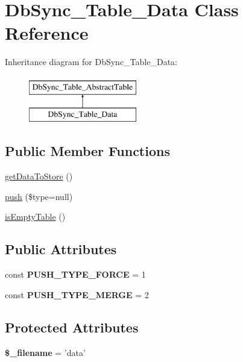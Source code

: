 \hypertarget{classDbSync__Table__Data}{
\section{DbSync\_\-Table\_\-Data Class Reference}
\label{classDbSync__Table__Data}
}
Inheritance diagram for DbSync\_\-Table\_\-Data:\begin{figure}[H]
\begin{center}
\leavevmode
\includegraphics[height=2.000000cm]{classDbSync__Table__Data}
\end{center}
\end{figure}
\subsection*{Public Member Functions}
\begin{DoxyCompactItemize}
\item 
\hyperlink{classDbSync__Table__Data_a20a58562f3d88d85e5cb9b25f8f0e1dd}{getDataToStore} ()
\item 
\hyperlink{classDbSync__Table__Data_a9aabe67240f491f9b65371e5b94035c9}{push} (\$type=null)
\item 
\hyperlink{classDbSync__Table__Data_ac0e0899e75987cc0d69bff20cc373985}{isEmptyTable} ()
\end{DoxyCompactItemize}
\subsection*{Public Attributes}
\begin{DoxyCompactItemize}
\item 
\hypertarget{classDbSync__Table__Data_a8e2a613542f603afc3908ee00de3341c}{
const {\bfseries PUSH\_\-TYPE\_\-FORCE} = 1}
\label{classDbSync__Table__Data_a8e2a613542f603afc3908ee00de3341c}

\item 
\hypertarget{classDbSync__Table__Data_a8e7ab56799909572dfec44cb5f3cfa58}{
const {\bfseries PUSH\_\-TYPE\_\-MERGE} = 2}
\label{classDbSync__Table__Data_a8e7ab56799909572dfec44cb5f3cfa58}

\end{DoxyCompactItemize}
\subsection*{Protected Attributes}
\begin{DoxyCompactItemize}
\item 
\hypertarget{classDbSync__Table__Data_a7142c5a301b52c2e8ba51777314d1e15}{
{\bfseries \$\_\-filename} = 'data'}
\label{classDbSync__Table__Data_a7142c5a301b52c2e8ba51777314d1e15}

\end{DoxyCompactItemize}


